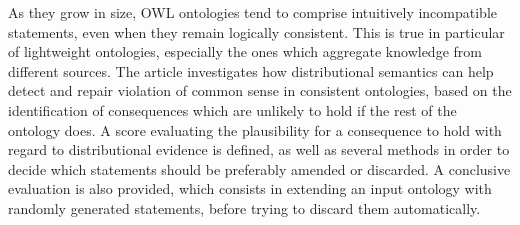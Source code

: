 As they grow in size, OWL ontologies tend to comprise intuitively incompatible statements, even when they remain logically consistent. This is true in particular of lightweight ontologies, especially the ones which aggregate knowledge from different sources. The article investigates how distributional semantics can help detect and repair violation of common sense in consistent ontologies, based on the identification of consequences which are unlikely to hold if the rest of the ontology does. A score evaluating the plausibility for a consequence to hold with regard to distributional evidence is defined, as well as several methods in order to decide which statements should be preferably amended or discarded. A conclusive evaluation is also provided, which consists in extending an input ontology with randomly generated statements, before trying to discard them automatically.
